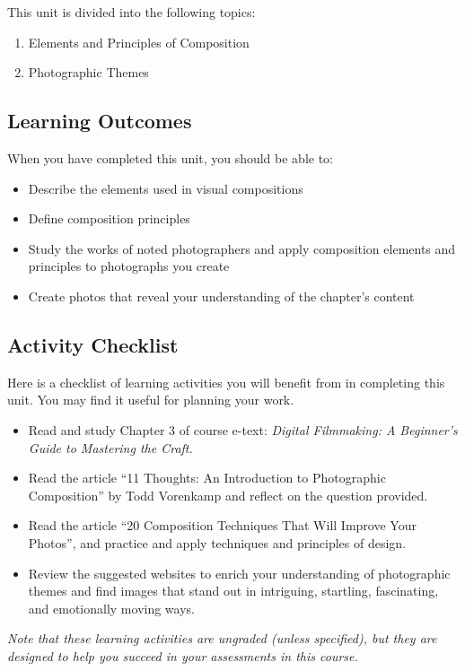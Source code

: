 \documentclass[
]{book}
\providecommand{\tightlist}{%
  \setlength{\itemsep}{0pt}\setlength{\parskip}{0pt}}
\begin{document}
This unit is divided into the following topics:

\begin{enumerate}
\def\labelenumi{\arabic{enumi}.}
\tightlist
\item
  Elements and Principles of Composition
\item
  Photographic Themes
\end{enumerate}

\hypertarget{learning-outcomes-2}{%
\subsection*{Learning Outcomes}\label{learning-outcomes-2}}

When you have completed this unit, you should be able to:

\begin{itemize}
\tightlist
\item
  Describe the elements used in visual compositions\\
\item
  Define composition principles\\
\item
  Study the works of noted photographers and apply composition elements and principles to photographs you create\\
\item
  Create photos that reveal your understanding of the chapter's content
\end{itemize}

\hypertarget{activity-checklist-2}{%
\subsection*{Activity Checklist}\label{activity-checklist-2}}

\begin{reflect}
Here is a checklist of learning activities you will benefit from in completing this unit. You may find it useful for planning your work.

\begin{itemize}
\tightlist
\item
  Read and study Chapter 3 of course e-text: \emph{Digital Filmmaking: A Beginner's Guide to Mastering the Craft.}
\item
  Read the article ``11 Thoughts: An Introduction to Photographic Composition'' by Todd Vorenkamp and reflect on the question provided.
\item
  Read the article ``20 Composition Techniques That Will Improve Your Photos'', and practice and apply techniques and principles of design.
\item
  Review the suggested websites to enrich your understanding of photographic themes and find images that stand out in intriguing, startling, fascinating, and emotionally moving ways.
\end{itemize}

\emph{Note that these learning activities are ungraded (unless specified), but they are designed to help you succeed in your assessments in this course.}
\end{reflect}
\end{document}

